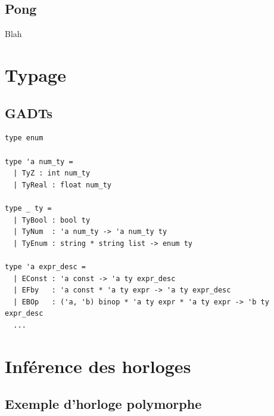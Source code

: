 \documentclass[11pt,usenames,dvipsnames]{beamer}
\begin{document}
\subsection{Pong}

\begin{frame}{\null}
  Blah
\end{frame}

\section{Typage}
\subsection{GADTs}
\begin{frame}[fragile]{\null}
  \begin{lstlisting}[language=caml]
type enum

type 'a num_ty =
  | TyZ : int num_ty
  | TyReal : float num_ty

type _ ty =
  | TyBool : bool ty
  | TyNum  : 'a num_ty -> 'a num_ty ty
  | TyEnum : string * string list -> enum ty

type 'a expr_desc =
  | EConst : 'a const -> 'a ty expr_desc
  | EFby   : 'a const * 'a ty expr -> 'a ty expr_desc
  | EBOp   : ('a, 'b) binop * 'a ty expr * 'a ty expr -> 'b ty expr_desc
  ...
  \end{lstlisting}
\end{frame}

\section{Inférence des horloges}
\subsection{Exemple d'horloge polymorphe}
\begin{frame}[fragile]{\null}
  

%
\end{frame}
\end{document}
